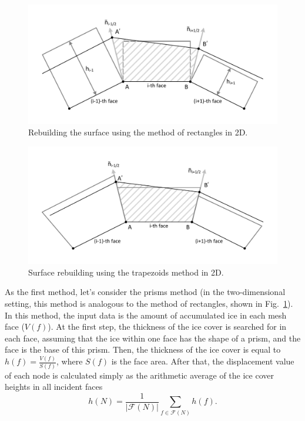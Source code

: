 \begin{figure}[ht]
\centering
\includegraphics[width=\textwidth]{pics/text_1_remesh_3d/pic_classical_methods_rectangles.pdf}
\caption{Rebuilding the surface using the method of rectangles in 2D.}\label{fig:pic_classical_methods_rectangles}
\end{figure}

\begin{figure}[ht]
\centering
\includegraphics[width=\textwidth]{pics/text_1_remesh_3d/pic_classical_methods_trapezoids.pdf}
\caption{Surface rebuilding using the trapezoids method in 2D.}\label{fig:pic_classical_methods_trapezoids}
\end{figure}

As the first method, let's consider the prisms method (in the two-dimensional setting, this method is analogous to the method of rectangles, shown in Fig.~\ref{fig:pic_classical_methods_rectangles}).
In this method, the input data is the amount of accumulated ice in each mesh face ($V(f)$).
At the first step, the thickness of the ice cover is searched for in each face, assuming that the ice within one face has the shape of a prism, and the face is the base of this prism.
Then, the thickness of the ice cover is equal to $h(f) =
\frac{V(f)}{S(f)}$, where $S(f)$ is the face area.
After that, the displacement value of each node is calculated simply
as the arithmetic average of the ice cover heights in all incident
faces
\begin{equation*}
h(N) = \frac{1}{|\mathscr{F}(N)|} \sum_{f \in \mathscr{F}(N)}{h(f)}.
\end{equation*}

